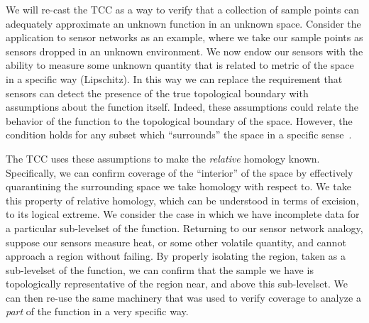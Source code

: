 
%


We will re-cast the TCC as a way to verify that a collection of sample points can adequately approximate an unknown function in an unknown space.
Consider the application to sensor networks as an example, where we take our sample points as sensors dropped in an unknown environment.
We now endow our sensors with the ability to measure some unknown quantity that is related to metric of the space in a specific way (Lipschitz).
In this way we can replace the requirement that sensors can detect the presence of the true topological boundary with assumptions about the function itself.
Indeed, these assumptions could relate the behavior of the function to the topological boundary of the space.
However, the condition holds for any subset which ``surrounds'' the space in a specific sense~\cite{cavanna2017when}.

The TCC uses these assumptions to make the \emph{relative} homology known.
Specifically, we can confirm coverage of the ``interior'' of the space by effectively quarantining the surrounding space we take homology with respect to.
We take this property of relative homology, which can be understood in terms of excision, to its logical extreme.
We consider the case in which we have incomplete data for a particular sub-levelset of the function.
Returning to our sensor network analogy, suppose our sensors measure heat, or some other volatile quantity, and cannot approach a region without failing.
By properly isolating the region, taken as a sub-levelset of the function, we can confirm that the sample we have is topologically representative of the region near, and above this sub-levelset.
We can then re-use the same machinery that was used to verify coverage to analyze a \emph{part} of the function in a very specific way.

